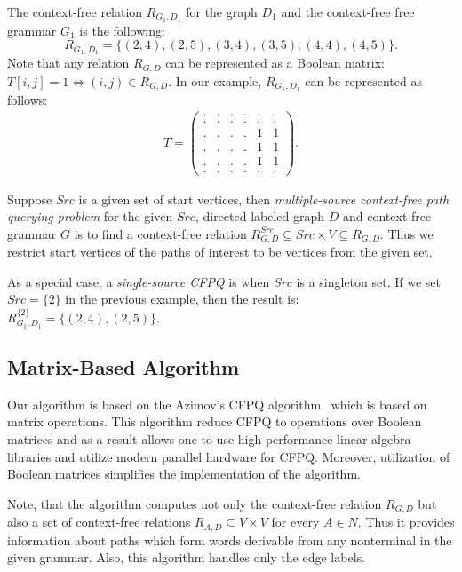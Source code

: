 The context-free relation $R_{G_1,D_1}$ for the graph $D_1$ and the context-free free grammar $G_1$ is the following:
$$R_{G_1, D_1} = \{(2, 4), (2, 5), (3, 4), (3, 5), (4, 4), (4, 5)\}.$$
Note that any relation $R_{G, D}$ can be represented as a Boolean matrix: $T[i,j] = 1 \iff (i,j) \in R_{G, D}.$
In our example, $R_{G_1, D_1}$ can be represented as follows:
{
    \renewcommand{\arraystretch}{0.5}
    \setlength\arraycolsep{1.5pt}
\begin{align*}
T =
\begin{pmatrix}
    . & . & . & . & . & . \\
    . & . & . & . & . & . \\
    . & . & . & . & 1 & 1 \\
    . & . & . & . & 1 & 1 \\
    . & . & . & . & 1 & 1 \\
    . & . & . & . & . & .
\end{pmatrix}.
\end{align*}
}

\begin{definition}
    Suppose $Src$ is a given set of start vertices, then \textit{multiple-source context-free path querying problem} for the given $Src$, directed labeled graph $D$ and context-free grammar $G$ is to find a context-free relation
    $R_{G, D}^{Src} \subseteq Src\times V \subseteq R_{G,D}.$
    Thus we restrict start vertices of the paths of interest to be vertices from the given set.
\end{definition}

As a special case, a \emph{single-source CFPQ} is when $Src$ is a singleton set.
If we set $Src=\{2\}$ in the previous example, then the result is: $R_{G_1, D_1}^{\{2\}} = \{(2, 4), (2, 5)\}.$

\subsection{Matrix-Based Algorithm}
Our algorithm is based on the Azimov's CFPQ algorithm~\cite{Azimov:2018:CPQ:3210259.3210264} which is based on matrix operations.
This algorithm reduce CFPQ to operations over Boolean matrices and as a result allows one to use high-performance linear algebra libraries and utilize modern parallel hardware for CFPQ.
Moreover, utilization of Boolean matrices simplifies the implementation of the algorithm.

Note, that the algorithm computes not only the context-free relation $R_{G,D}$ but also a set of context-free relations $R_{A,D} \subseteq V \times V$ for every $A \in N$.
Thus it provides information about paths which form words derivable from any nonterminal in the given grammar.
Also, this algorithm handles only the edge labels.

